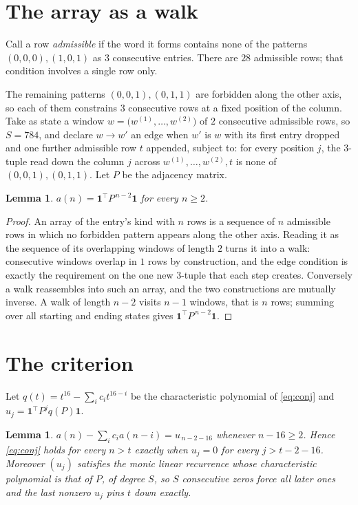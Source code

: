 \documentclass[11pt,a4paper]{article}
\theoremstyle{plain}
\newtheorem{lemma}[theorem]{Lemma}
\theoremstyle{definition}
\begin{document}
\section{The array as a walk}

Call a row \emph{admissible} if the word it forms contains none of the patterns
$(0,0,0), (1,0,1)$ as $3$ consecutive entries. There are $28$ admissible rows; that condition
involves a single row only.

The remaining patterns $(0,0,1), (0,1,1)$ are forbidden along the other axis, so each of them
constrains $3$ consecutive rows at a fixed position of the column. Take as state a
window $w=\bigl(w^{(1)},\dots,w^{(2)}\bigr)$ of $2$ consecutive admissible
rows, so $S=784$, and declare $w\to w'$ an edge when $w'$ is $w$ with its first entry
dropped and one further admissible row $t$ appended, subject to: for every position
$j$, the $3$-tuple read down the column $j$ across $w^{(1)},\dots,w^{(2)},t$
is none of $(0,0,1), (0,1,1)$. Let $P$ be the adjacency matrix.

\begin{lemma}\label{lem:walk}
$a(n)=\mathbf{1}^{\!\top}P^{\,n-2}\mathbf{1}$ for every $n\ge2$.
\end{lemma}

\begin{proof}
An array of the entry's kind with $n$ rows is a sequence of $n$ admissible rows in
which no forbidden pattern appears along the other axis. Reading it as the sequence of its
overlapping windows of length $2$ turns it into a walk: consecutive windows overlap in
$1$ rows by construction, and the edge condition is exactly the requirement on the one
new $3$-tuple that each step creates. Conversely a walk reassembles into such an array,
and the two constructions are mutually inverse. A walk of length $n-2$ visits $n-1$
windows, that is $n$ rows; summing over all starting and ending states gives
$\mathbf{1}^{\!\top}P^{\,n-2}\mathbf{1}$.
\end{proof}

\section{The criterion}

Let $q(t)=t^{16}-\sum_i c_i t^{16-i}$ be the characteristic polynomial of
\eqref{eq:conj} and $u_j=\mathbf{1}^{\!\top}P^{j}q(P)\mathbf{1}$.

\begin{lemma}\label{lem:crit}
$a(n)-\sum_i c_i a(n-i)=u_{\,n-2-16}$ whenever $n-16\ge2$. Hence
\eqref{eq:conj} holds for every $n>t$ exactly when $u_j=0$ for every
$j>t-2-16$. Moreover $(u_j)$ satisfies the monic linear recurrence whose
characteristic polynomial is that of $P$, of degree $S$, so $S$ consecutive zeros force all
later ones and the last nonzero $u_j$ pins $t$ down exactly.
\end{lemma}
\end{document}
